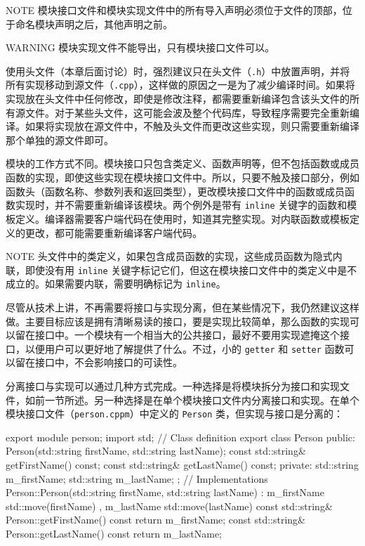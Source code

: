 \begin{myNotic}{NOTE}
模块接口文件和模块实现文件中的所有导入声明必须位于文件的顶部，位于命名模块声明之后，其他声明之前。
\end{myNotic}

\begin{myWarning}{WARNING}
模块实现文件不能导出，只有模块接口文件可以。
\end{myWarning}


使用头文件（本章后面讨论）时，强烈建议只在头文件（\verb|.h|）中放置声明，并将所有实现移动到源文件（\verb|.cpp|），这样做的原因之一是为了减少编译时间。如果将实现放在头文件中任何修改，即使是修改注释，都需要重新编译包含该头文件的所有源文件。对于某些头文件，这可能会波及整个代码库，导致程序需要完全重新编译。如果将实现放在源文件中，不触及头文件而更改这些实现，则只需要重新编译那个单独的源文件即可。

模块的工作方式不同。模块接口只包含类定义、函数声明等，但不包括函数或成员函数的实现，即使这些实现在模块接口文件中。所以，只要不触及接口部分，例如函数头（函数名称、参数列表和返回类型），更改模块接口文件中的函数或成员函数实现时，并不需要重新编译该模块。两个例外是带有 \verb|inline| 关键字的函数和模板定义。编译器需要客户端代码在使用时，知道其完整实现。对内联函数或模板定义的更改，都可能需要重新编译客户端代码。

\begin{myNotic}{NOTE}
头文件中的类定义，如果包含成员函数的实现，这些成员函数为隐式内联，即使没有用 \verb|inline| 关键字标记它们，但这在模块接口文件中的类定义中是不成立的。如果需要内联，需要明确标记为 \verb|inline|。
\end{myNotic}

尽管从技术上讲，不再需要将接口与实现分离，但在某些情况下，我仍然建议这样做。主要目标应该是拥有清晰易读的接口，要是实现比较简单，那么函数的实现可以留在接口中。一个模块有一个相当大的公共接口，最好不要用实现遮掩这个接口，以便用户可以更好地了解提供了什么。不过，小的 \verb|getter| 和 \verb|setter| 函数可以留在接口中，不会影响接口的可读性。

分离接口与实现可以通过几种方式完成。一种选择是将模块拆分为接口和实现文件，如前一节所述。另一种选择是在单个模块接口文件内分离接口和实现。在单个模块接口文件（\verb|person.cppm|）中定义的 \verb|Person| 类，但实现与接口是分离的：

\begin{cpp}
export module person;
import std;
// Class definition
export class Person
{
    public:
        Person(std::string firstName, std::string lastName);
        const std::string& getFirstName() const;
        const std::string& getLastName() const;
    private:
        std::string m_firstName;
        std::string m_lastName;
};
// Implementations
Person::Person(std::string firstName, std::string lastName)
    : m_firstName { std::move(firstName) }, m_lastName { std::move(lastName) } { }
const std::string& Person::getFirstName() const { return m_firstName; }
const std::string& Person::getLastName() const { return m_lastName; }
\end{cpp}


